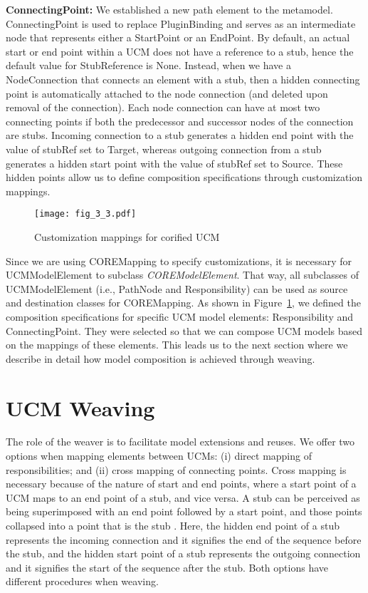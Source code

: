 \textbf{\cls ConnectingPoint:} We established a new path element to the metamodel. {\cls ConnectingPoint} is used to replace {\cls PluginBinding} and serves as an intermediate node that represents either a {\cls StartPoint} or an {\cls EndPoint}. By default, an actual start or end point within a UCM does not have a reference to a stub, hence the default value for {\cls StubReference} is {\cls None}. Instead, when we have a {\cls NodeConnection} that connects an element with a stub, then a hidden connecting point is automatically attached to the node connection (and deleted upon removal of the connection). Each node connection can have at most two connecting points if both the predecessor and successor nodes of the connection are stubs. Incoming connection to a stub generates a hidden end point with the value of {\cls stubRef} set to {\cls Target}, whereas outgoing connection from a stub generates a hidden start point with the value of {\cls stubRef} set to {\cls Source}. These hidden points allow us to define composition specifications through customization mappings.

\begin{figure}
	\centering
	\texttt{[image: fig\_3\_3.pdf]}
	\caption{Customization mappings for corified UCM}
	\label{fig:3.3}
\end{figure}

Since we are using {\cls COREMapping} to specify customizations, it is necessary for {\cls UCMModelElement} to subclass \emph{\cls COREModelElement}. That way, all subclasses of {\cls UCMModelElement} (i.e., {\cls PathNode} and {\cls Responsibility}) can be used as source and destination classes for {\cls COREMapping}. As shown in Figure~\ref{fig:3.3}, we defined the composition specifications for specific UCM model elements: {\cls Responsibility} and {\cls ConnectingPoint}. They were selected so that we can compose UCM models based on the mappings of these elements. This leads us to the next section where we describe in detail how model composition is achieved through weaving.

\section{UCM Weaving} \label{sec:3.2}

The role of the weaver is to facilitate model extensions and reuses. We offer two options when mapping elements between UCMs: (i) direct mapping of responsibilities; and (ii) cross mapping of connecting points. Cross mapping is necessary because of the nature of start and end points, where a start point of a UCM maps to an end point of a stub, and vice versa. A stub can be perceived as being superimposed with an end point followed by a start point, and those points collapsed into a point that is the stub \cite{buhr1995use}. Here, the hidden end point of a stub represents the incoming connection and it signifies the end of the sequence before the stub, and the hidden start point of a stub represents the outgoing connection and it signifies the start of the sequence after the stub. Both options have different procedures when weaving.

